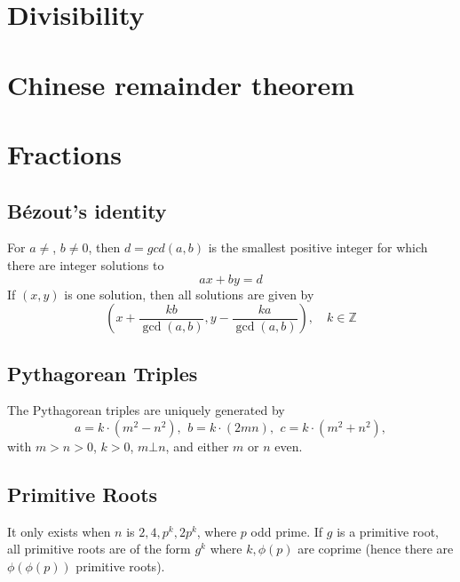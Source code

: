 \section{Divisibility}

\section{Chinese remainder theorem}

\section{Fractions}

\subsection{Bézout's identity}
For $a \neq $, $b \neq 0$, then $d=gcd(a,b)$ is the smallest positive integer for which there are integer solutions to
$$ax+by=d$$
If $(x,y)$ is one solution, then all solutions are given by
$$\left(x+\frac{kb}{\gcd(a,b)}, y-\frac{ka}{\gcd(a,b)}\right), \quad k\in\mathbb{Z}$$



\subsection{Pythagorean Triples}
 The Pythagorean triples are uniquely generated by
 \[ a=k\cdot (m^{2}-n^{2}),\ \,b=k\cdot (2mn),\ \,c=k\cdot (m^{2}+n^{2}), \]
 with $m > n > 0$, $k > 0$, $m \bot n$, and either $m$ or $n$ even.



\subsection{Primitive Roots}
	It only exists when $n$ is $2, 4, p^k, 2p^k$, where $p$ odd prime.
	If $g$ is a primitive root, all primitive roots are of the form $g^k$
	where $k,\phi(p)$ are coprime (hence there are $\phi(\phi(p))$ primitive roots).



